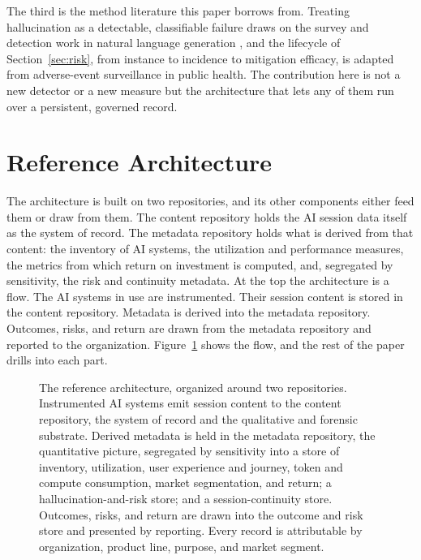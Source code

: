 \documentclass[11pt]{article}
\begin{document}
The third is the method literature this paper borrows from. Treating hallucination
as a detectable, classifiable failure draws on the survey and detection work in
natural language generation \cite{ji2023hallucination}, and the lifecycle of
Section~\ref{sec:risk}, from instance to incidence to mitigation efficacy, is
adapted from adverse-event surveillance in public health. The contribution here is
not a new detector or a new measure but the architecture that lets any of them run
over a persistent, governed record.

\section{Reference Architecture}
\label{sec:architecture}

The architecture is built on two repositories, and its other components either
feed them or draw from them. The content repository holds the AI session data
itself as the system of record. The metadata repository holds what is derived from
that content: the inventory of AI systems, the utilization and performance
measures, the metrics from which return on investment is computed, and, segregated
by sensitivity, the risk and continuity metadata. At the top the architecture is a
flow. The AI systems in use are instrumented. Their session content is stored in
the content repository. Metadata is derived into the metadata repository. Outcomes,
risks, and return are drawn from the metadata repository and reported to the
organization. Figure~\ref{fig:arch} shows the flow, and the rest of the paper
drills into each part.

\begin{figure}[t]
\centering
\resizebox{\textwidth}{!}{}
\caption{The reference architecture, organized around two repositories.
Instrumented AI systems emit session content to the content repository, the system
of record and the qualitative and forensic substrate. Derived metadata is held in
the metadata repository, the quantitative picture, segregated by sensitivity into a
store of inventory, utilization, user experience and journey, token and compute
consumption, market segmentation, and return; a hallucination-and-risk store; and a
session-continuity store. Outcomes, risks, and return are drawn into the outcome and
risk store and presented by reporting. Every record is attributable by
organization, product line, purpose, and market segment.}
\label{fig:arch}
\end{figure}
\end{document}
